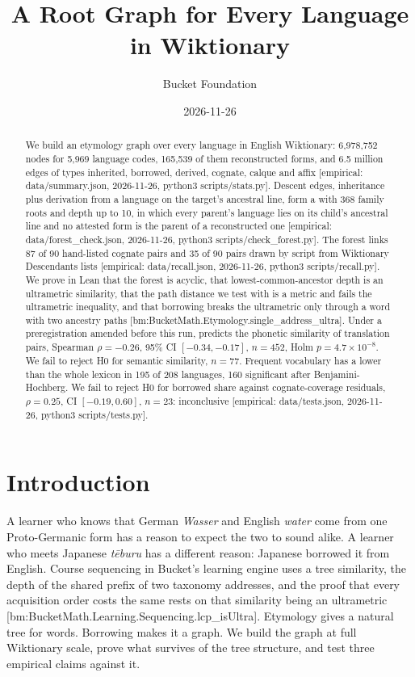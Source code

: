 \documentclass[11pt]{article}
\title{A Root Graph for Every Language in Wiktionary}
\author{Bucket Foundation}
\date{2026-11-26}
\newcommand{\emp}[1]{{\small[empirical: #1]}}
\newcommand{\bm}[1]{{\small[bm:#1]}}
\newcommand{\sumrun}{data/summary.json, 2026-11-26, python3 scripts/stats.py}
\newcommand{\recrun}{data/recall.json, 2026-11-26, python3 scripts/recall.py}
\newcommand{\checkrun}{data/forest\_check.json, 2026-11-26, python3 scripts/check\_forest.py}
\newcommand{\testrun}{data/tests.json, 2026-11-26, python3 scripts/tests.py}
\begin{document}
\maketitle

\begin{abstract}
We build an etymology graph over every language in English Wiktionary:
6,978,752 nodes for 5,969 language codes, 165,539 of them reconstructed
forms, and 6.5 million edges of types inherited, borrowed, derived,
cognate, calque and affix \emp{\sumrun}. Descent edges, inheritance plus
derivation from a language on the target's ancestral line, form a
 with 368 family roots and depth up to 10, in which
every parent's language lies on its child's ancestral line and no
attested form is the parent of a reconstructed one \emp{\checkrun}. The
forest links 87 of 90 hand-listed cognate pairs and 35 of 90 pairs drawn
by script from Wiktionary Descendants lists \emp{\recrun}. We prove in
Lean that the forest is acyclic, that lowest-common-ancestor depth is an
ultrametric similarity, that the path distance we test with is a metric
and fails the ultrametric inequality, and that borrowing breaks the
ultrametric only through a word with two ancestry paths
\bm{BucketMath.Etymology.single\_address\_ultra}. Under a preregistration
amended before this run,  predicts the
phonetic similarity of translation pairs, Spearman $\rho=-0.26$, 95\% CI
$[-0.34,-0.17]$, $n=452$, Holm $p=4.7\times10^{-8}$. We fail to reject H0
for semantic similarity, $n=77$. Frequent vocabulary has a lower
 than the whole lexicon in 195 of 208
languages, 160 significant after Benjamini-Hochberg. We fail to reject H0
for borrowed share against cognate-coverage residuals, $\rho=0.25$, CI
$[-0.19,0.60]$, $n=23$: inconclusive \emp{\testrun}.
\end{abstract}

\section{Introduction}
\label{sec:intro}

A learner who knows that German \emph{Wasser} and English \emph{water}
come from one Proto-Germanic form has a reason to expect the two to sound
alike. A learner who meets Japanese \emph{tēburu} has a different reason:
Japanese borrowed it from English. Course sequencing in Bucket's learning
engine uses a tree similarity, the depth of the shared prefix of two
taxonomy addresses, and the proof that every acquisition order costs the
same rests on that similarity being an ultrametric
\bm{BucketMath.Learning.Sequencing.lcp\_isUltra}. Etymology gives a
natural tree for words. Borrowing makes it a graph. We build the graph at
full Wiktionary scale, prove what survives of the tree structure, and test
three empirical claims against it.
\end{document}
